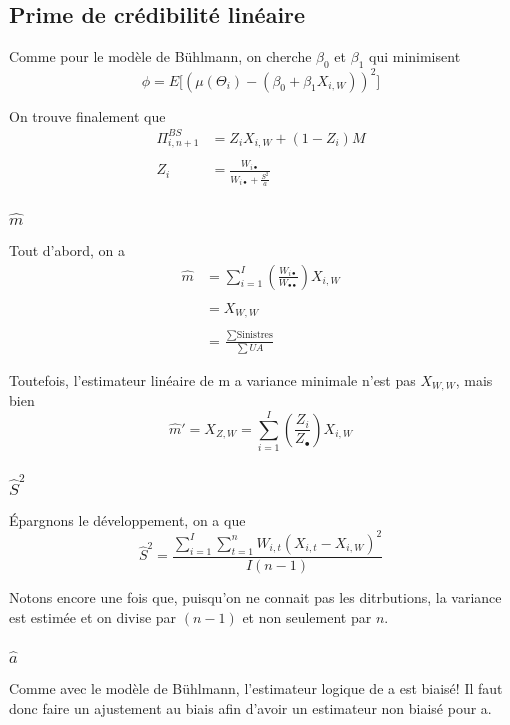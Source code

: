 \documentclass[11pt,french]{report}
\begin{document}
\subsection{ Prime de crédibilité linéaire}
Comme pour le modèle de Bühlmann, on cherche $\beta_0$ et $\beta_1$ qui minimisent 
$$\phi = E\bigg[\left(\mu(\Theta_i)-(\beta_0+\beta_1 X_{i,W}) \right)^2 \bigg]$$

On trouve finalement que
$$\begin{aligned}
\Pi_{i,n+1}^{BS} &= Z_i X_{i,W} + (1-Z_i)M \\ \\
Z_i &= \frac{W_{i \bullet}}{W_{i \bullet} +\frac{S^2}{a}}
\end{aligned}$$

\subsubsection{$\widehat{m}$ } 

Tout d'abord, on a 
$$\boxed{\begin{aligned}
\widehat{m} &= \sum_{i=1}^I \left(\frac{W_{i \bullet}}{W_{\bullet \bullet}}\right) X_{i,W} \\ \\
&= X_{W,W} \\ \\
&= \frac{\sum \text{Sinistres}}{\sum UA}
\end{aligned}}$$

Toutefois, l'estimateur linéaire de m a variance minimale n'est pas $X_{W,W}$, mais bien
$$\boxed{\widehat{m}' = X_{Z,W} = \sum_{i=1}^I \left(\frac{Z_i}{Z_{\bullet}} \right) X_{i,W}}$$

\subsubsection{ $\widehat{S}^2$}
Épargnons le développement, on a que 
$$\boxed{\widehat{S}^2 = \frac{\sum_{i=1}^I \sum_{t=1}^n W_{i,t} (X_{i,t} - X_{i,W})^2}{I(n-1)}}$$

Notons encore une fois que, puisqu'on ne connait pas les ditrbutions, la variance est estimée et on divise par $(n-1)$ et non seulement par $n$.

\subsubsection{$\widehat{a}$ } 
Comme avec le modèle de Bühlmann, l'estimateur logique de a est biaisé! Il faut donc faire un ajustement au biais afin d'avoir un estimateur non biaisé pour a.
\end{document}
